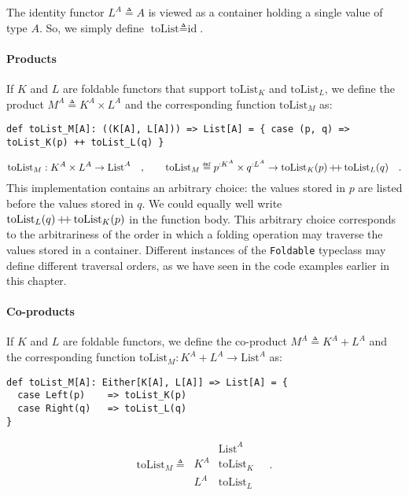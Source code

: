 The identity functor $L^{A}\triangleq A$ is viewed as a container
holding a single value of type $A$. So, we simply define $\text{toList}\triangleq\text{id}$.

\paragraph{Products}

If $K$ and $L$ are foldable functors that support $\text{toList}_{K}$
and $\text{toList}_{L}$, we define the product $M^{A}\triangleq K^{A}\times L^{A}$
and the corresponding function $\text{toList}_{M}$ as:
\begin{lstlisting}
def toList_M[A]: ((K[A], L[A])) => List[A] = { case (p, q) => toList_K(p) ++ toList_L(q) }
\end{lstlisting}
\[
\text{toList}_{M}:K^{A}\times L^{A}\rightarrow\text{List}^{A}\quad,\quad\quad\text{toList}_{M}\triangleq p^{:K^{A}}\times q^{:L^{A}}\rightarrow\text{toList}_{K}(p)\,\pplus\,\text{toList}_{L}(q)\quad.
\]
This implementation contains an arbitrary choice: the values stored
in $p$ are listed before the values stored in $q$. We could equally
well write $\text{toList}_{L}(q)\,{\displaystyle }{+\negmedspace+}\,\text{toList}_{K}(p)$ in
the function body. This arbitrary choice corresponds to the arbitrariness
of the order in which a folding operation may traverse the values
stored in a container. Different instances of the \lstinline!Foldable!
typeclass may define different traversal orders, as we have seen in
the code examples earlier in this chapter.

\paragraph{Co-products}

If $K$ and $L$ are foldable functors, we define the co-product $M^{A}\triangleq K^{A}+L^{A}$
and the corresponding function $\text{toList}_{M}:K^{A}+L^{A}\rightarrow\text{List}^{A}$
as:
\begin{lstlisting}
def toList_M[A]: Either[K[A], L[A]] => List[A] = {
  case Left(p)    => toList_K(p)
  case Right(q)   => toList_L(q)
}
\end{lstlisting}
\[
\text{toList}_{M}\triangleq\,\begin{array}{|c||c|}
 & \text{List}^{A}\\
\hline K^{A} & \text{toList}_{K}\\
L^{A} & \text{toList}_{L}
\end{array}\quad.
\]


